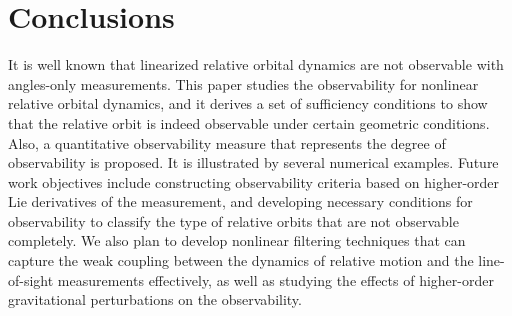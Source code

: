 %
%
%






\section{Conclusions}

It is well known that linearized relative orbital dynamics are not observable with angles-only
measurements. This paper studies the observability for nonlinear relative orbital dynamics, and it derives a set of sufficiency conditions to show that the relative orbit is indeed observable under certain geometric conditions. Also, a quantitative observability measure that represents the degree of observability is proposed. It is illustrated by several numerical examples. Future work objectives include constructing observability criteria based on higher-order Lie derivatives of the measurement, and developing necessary conditions for observability to classify the type of relative orbits that are not observable completely. We also plan to develop nonlinear filtering techniques that can capture the weak coupling between the dynamics of relative motion and the line-of-sight measurements effectively, as well as studying the effects of higher-order gravitational perturbations on the observability. 

